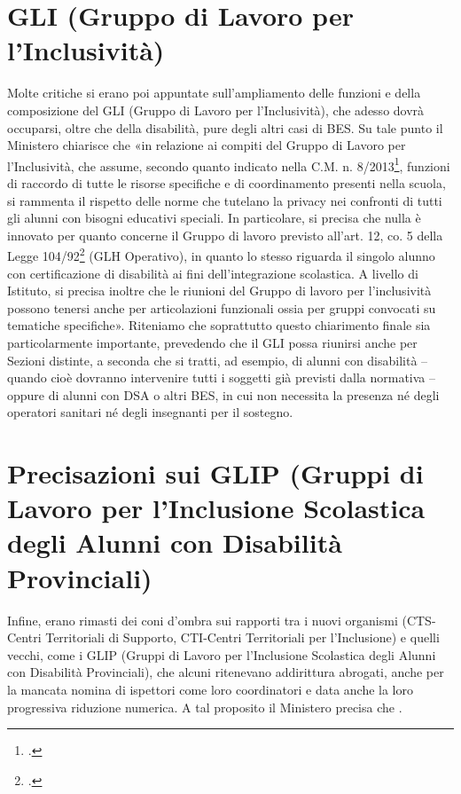 \section*{GLI (Gruppo di Lavoro per l'Inclusività)}
Molte critiche si erano poi appuntate sull'ampliamento delle funzioni e della composizione del GLI (Gruppo di Lavoro per l'Inclusività), che adesso dovrà occuparsi, oltre che della disabilità, pure degli altri casi di BES.
Su tale punto il Ministero chiarisce che «in relazione ai compiti del Gruppo di Lavoro per l'Inclusività, che assume, secondo quanto indicato nella C.M. n. 8/2013\footcite{cm8_2013}, funzioni di raccordo di tutte le risorse specifiche e di coordinamento presenti nella scuola, si rammenta il rispetto delle norme che tutelano la privacy nei confronti di tutti gli alunni con bisogni educativi speciali. In particolare, si precisa che nulla è innovato per quanto concerne il Gruppo di lavoro previsto all'art. 12, co. 5 della Legge 104/92\footcite{Legge_104_92} (GLH Operativo), in quanto lo stesso riguarda il singolo alunno con certificazione di disabilità ai fini dell'integrazione scolastica. A livello di Istituto, si precisa inoltre che le riunioni del Gruppo di lavoro per l'inclusività possono tenersi anche per articolazioni funzionali ossia per gruppi convocati su tematiche specifiche».
Riteniamo che soprattutto questo chiarimento finale sia particolarmente importante, prevedendo che il GLI possa riunirsi anche per Sezioni distinte, a seconda che si tratti, ad esempio, di alunni con disabilità – quando cioè dovranno intervenire tutti i soggetti già previsti dalla normativa – oppure di alunni con DSA o altri BES, in cui non necessita la presenza né degli operatori sanitari né degli insegnanti per il sostegno.
\section*{Precisazioni sui GLIP (Gruppi di Lavoro per l'Inclusione Scolastica degli Alunni con Disabilità Provinciali)}
Infine, erano rimasti dei coni d'ombra sui rapporti tra i nuovi organismi (CTS-Centri Territoriali di Supporto, CTI-Centri Territoriali per l'Inclusione) e quelli vecchi, come i GLIP (Gruppi di Lavoro per l'Inclusione Scolastica degli Alunni con Disabilità Provinciali), che alcuni ritenevano addirittura abrogati, anche per la mancata nomina di ispettori come loro coordinatori e data anche la loro progressiva riduzione numerica.
A tal proposito il Ministero precisa che .

